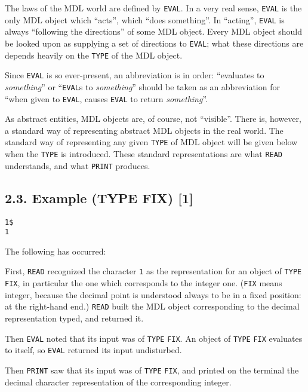 \documentclass[a4paper,]{article}
\begin{document}
The laws of the MDL world are defined by \texttt{EVAL}. In a very real sense, \texttt{EVAL} is the only MDL object which
``acts'', which ``does something''. In ``acting'', \texttt{EVAL} is always ``following the directions'' of some MDL object.
Every MDL object should be looked upon as supplying a set of directions to \texttt{EVAL}; what these directions are depends
heavily on the \texttt{TYPE} of the MDL object.

Since \texttt{EVAL} is so ever-present, an abbreviation is in order: ``evaluates to \emph{something}'' or ``\texttt{EVAL}s
to \emph{something}'' should be taken as an abbreviation for ``when given to \texttt{EVAL}, causes \texttt{EVAL} to return
\emph{something}''.

As abstract entities, MDL objects are, of course, not ``visible''. There is, however, a standard way of representing
abstract MDL objects in the real world. The standard way of representing any given \texttt{TYPE} of MDL object will be
given below when the \texttt{TYPE} is introduced. These standard representations are what \texttt{READ} understands, and
what \texttt{PRINT} produces.

\subsection{2.3. Example (TYPE FIX) {[}1{]}}\label{example-type-fix-1}

\begin{verbatim}
1$
1
\end{verbatim}

The following has occurred:

First, \texttt{READ} recognized the character \texttt{1} as the representation for an object of \texttt{TYPE}
\texttt{FIX}, in particular the one which corresponds to the integer one. (\texttt{FIX} means integer,
because the decimal point is understood always to be in a fixed position: at the right-hand end.) \texttt{READ} built the
MDL object corresponding to the decimal representation typed, and returned it.

Then \texttt{EVAL} noted that its input was of \texttt{TYPE} \texttt{FIX}. An object of \texttt{TYPE} \texttt{FIX}
evaluates to itself, so \texttt{EVAL} returned its input undisturbed.

Then \texttt{PRINT} saw that its input was of \texttt{TYPE} \texttt{FIX}, and printed on the terminal the decimal character
representation of the corresponding integer.
\end{document}
